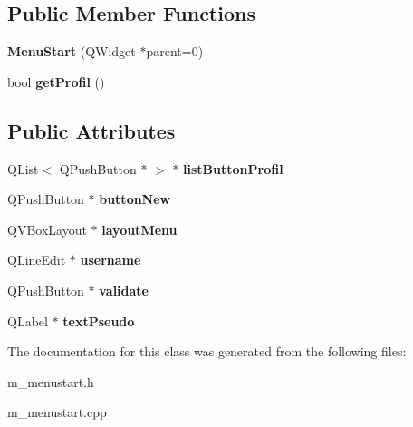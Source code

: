 \subsection*{Public Member Functions}
\begin{DoxyCompactItemize}
\item 
\hypertarget{class_menu_start_a184ff65bb2534378670fee22487b02eb}{}{\bfseries Menu\+Start} (Q\+Widget $\ast$parent=0)\label{class_menu_start_a184ff65bb2534378670fee22487b02eb}

\item 
\hypertarget{class_menu_start_aa472610f5ba9e271cb02159d2ca421cc}{}bool {\bfseries get\+Profil} ()\label{class_menu_start_aa472610f5ba9e271cb02159d2ca421cc}

\end{DoxyCompactItemize}
\subsection*{Public Attributes}
\begin{DoxyCompactItemize}
\item 
\hypertarget{class_menu_start_a04d0eac4832176f91f62172757ce0616}{}Q\+List$<$ Q\+Push\+Button $\ast$ $>$ $\ast$ {\bfseries list\+Button\+Profil}\label{class_menu_start_a04d0eac4832176f91f62172757ce0616}

\item 
\hypertarget{class_menu_start_af01ac293a06b0da924be0ad29aa587cf}{}Q\+Push\+Button $\ast$ {\bfseries button\+New}\label{class_menu_start_af01ac293a06b0da924be0ad29aa587cf}

\item 
\hypertarget{class_menu_start_a9426199e93ab1722b19b4e4e178b0164}{}Q\+V\+Box\+Layout $\ast$ {\bfseries layout\+Menu}\label{class_menu_start_a9426199e93ab1722b19b4e4e178b0164}

\item 
\hypertarget{class_menu_start_abf21ea1841ef22859a15b1c201b8bbf6}{}Q\+Line\+Edit $\ast$ {\bfseries username}\label{class_menu_start_abf21ea1841ef22859a15b1c201b8bbf6}

\item 
\hypertarget{class_menu_start_a06ebe4101b60777e4e1465e1073d533b}{}Q\+Push\+Button $\ast$ {\bfseries validate}\label{class_menu_start_a06ebe4101b60777e4e1465e1073d533b}

\item 
\hypertarget{class_menu_start_a427333babe7349783094bc9257462cb0}{}Q\+Label $\ast$ {\bfseries text\+Pseudo}\label{class_menu_start_a427333babe7349783094bc9257462cb0}

\end{DoxyCompactItemize}


The documentation for this class was generated from the following files\+:\begin{DoxyCompactItemize}
\item 
m\+\_\+menustart.\+h\item 
m\+\_\+menustart.\+cpp\end{DoxyCompactItemize}
